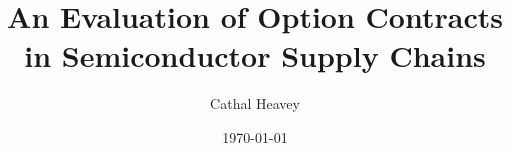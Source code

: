 \documentclass[12pt,english]{article}
\begin{document}
\title{An Evaluation of Option Contracts in Semiconductor Supply Chains}




\author{Cathal Heavey}



\date{\today}



\maketitle 

\listoftodos

\end{document}
